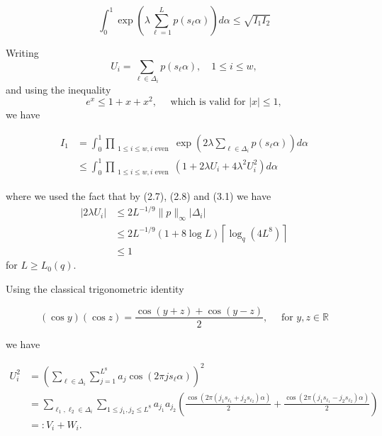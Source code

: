 \documentclass[10pt]{article}
\newcommand{\1}{\mathbf{1}}
\begin{document}
\begin{equation*}
\int_{0}^{1} \exp \left(\lambda \sum_{\ell=1}^{L} p\left(s_{\ell} \alpha\right)\right) d \alpha \leqslant \sqrt{I_{1} I_{2}} \tag{3.2}
\end{equation*}

Writing
$$
U_{i}=\sum_{\ell \in \Delta_{i}} p\left(s_{\ell} \alpha\right), \quad 1 \leqslant i \leqslant w,
$$
and using the inequality
$$
e^{x} \leqslant 1+x+x^{2}, \quad \text { which is valid for }|x| \leqslant 1,
$$
we have

\begin{align*}
I_{1} & =\int_{0}^{1} \prod_{\substack{1 \leqslant i \leqslant w, i \text{ even}}} \exp \left(2 \lambda \sum_{\ell \in \Delta_{i}} p\left(s_{\ell} \alpha\right)\right) d \alpha  \tag{3.3}\\
& \leqslant \int_{0}^{1} \prod_{\substack{1 \leqslant i \leqslant w, i \text{ even}}}\left(1+2 \lambda U_{i}+4 \lambda^{2} U_{i}^{2}\right) d \alpha
\end{align*}

where we used the fact that by (2.7), (2.8) and (3.1) we have
$$
\begin{aligned}
\left|2 \lambda U_{i}\right| & \leqslant 2 L^{-1 / 9}\|p\|_{\infty}\left|\Delta_{i}\right| \\
& \leqslant 2 L^{-1 / 9}(1+8 \log L)\left\lceil\log _{q}\left(4 L^{8}\right)\right\rceil \\
& \leqslant 1
\end{aligned}
$$
for $L\geqslant L_0(q)$.

Using the classical trigonometric identity


\begin{equation*}
(\cos y)(\cos z)=\frac{\cos (y+z)+\cos (y-z)}{2}, \quad \text{ for } y, z \in \mathbb{R} \tag{3.4}
\end{equation*}


we have


\begin{align*}
U_i^2
&=\left(\sum_{\ell\in\Delta_i}\sum_{j=1}^{L^8}a_j\cos(2\pi j s_\ell\alpha)\right)^2\\
&=\sum_{\ell_1,\ell_2\in\Delta_i}
  \sum_{1\leqslant j_1,j_2\leqslant L^8}a_{j_1}a_{j_2}
  \left(
    \frac{\cos\!\left(2\pi(j_1s_{\ell_1}+j_2s_{\ell_2})\alpha\right)}{2}
    +\frac{\cos\!\left(2\pi(j_1s_{\ell_1}-j_2s_{\ell_2})\alpha\right)}{2}
  \right) \tag{3.5}\\
&=:V_i+W_i. \tag{3.6}
\end{align*}
\end{document}
